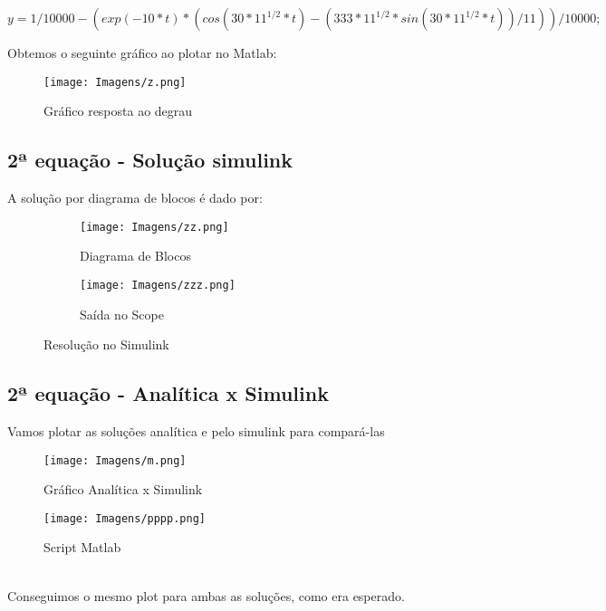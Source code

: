 \documentclass[a4paper, 12pt]{article}
\begin{document}
	\begin{equation}
		y = 1/10000 - (exp(-10*t)*(cos(30*11^{1/2}*t) - (333*11^{1/2}*sin(30*11^{1/2}*t))/11))/10000;
	\end{equation}		
		
		
	Obtemos o seguinte gráfico ao plotar no Matlab:
	\begin{figure}[h]
		\center
		\texttt{[image: Imagens/z.png]}
		\caption{Gráfico resposta ao degrau}
	\end{figure}
	
	
	\newpage
\subsection{2ª equação - Solução simulink}
	A solução por diagrama de blocos é dado por:
	\begin{figure}[h]
	\centering
		\begin{subfigure}{.5\textwidth}
  			\centering
 			\texttt{[image: Imagens/zz.png]}
  			\caption{Diagrama de Blocos}
		\end{subfigure}%
		\begin{subfigure}{.5\textwidth}
  			\centering
  			\texttt{[image: Imagens/zzz.png]}
  			\caption{Saída no Scope}
		\end{subfigure}
			\caption{Resolução no Simulink}
	\end{figure}
\newpage
\subsection{2ª equação - Analítica x Simulink}
	Vamos plotar as soluções analítica e pelo simulink para compará-las
	\begin{figure}[h]
		\centering
		\texttt{[image: Imagens/m.png]}
		\caption{Gráfico Analítica x Simulink}
	\end{figure}
	\begin{figure}[h]
		\centering
		\texttt{[image: Imagens/pppp.png]}
		\caption{Script Matlab}
	\end{figure}
	\\Conseguimos o mesmo plot para ambas as soluções, como era esperado.
	


	
	
	
	
	
	
	
	
	
	
	
\end{document}
